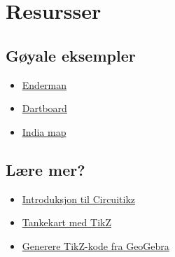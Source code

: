 \documentclass[12pt, a4paper]{article}
\begin{document}
\newpage
\section{Resursser}
\subsection*{Gøyale eksempler}
\begin{itemize}
	\item
	\href{http://www.texample.net/tikz/examples/enderman/}{Enderman}

	\item
	\href{http://www.texample.net/tikz/examples/dartboard/}{Dartboard}

	\item
	\href{http://www.texample.net/tikz/examples/india-map/}{India map}
\end{itemize}

\subsection*{Lære mer?}
\begin{itemize}
	\item
	\href{https://www.sharelatex.com/blog/2013/09/02/tikz-series-pt4.html}{Introduksjon til Circuitikz}

	\item
	\href{https://www.sharelatex.com/blog/2013/09/04/tikz-series-pt5.html}{Tankekart med TikZ}

	\item
	\href{https://www.sharelatex.com/blog/2013/08/28/tikz-series-pt2.html}{Generere TikZ-kode fra GeoGebra}
\end{itemize}
\end{document}
